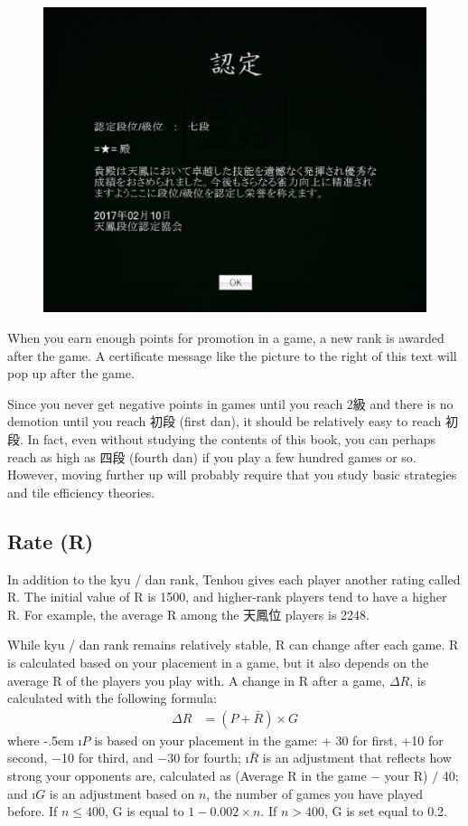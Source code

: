 \bigskip
\begin{figure}
\vspace{-30pt}
\begin{center}
\includegraphics[width=.45\textwidth,clip]{figs/7dan}
\end{center}
\vspace{-25pt}
\end{figure}
When you earn enough points for promotion in a game, a new rank is awarded after the game. A certificate message like the picture to the right of this text will pop up after the game. 

\bigskip
Since you never get negative points in games until you reach 2級 and there is no demotion until you reach 初段 (first {\jap dan}), it should be relatively easy to reach 初段. In fact, even without studying the contents of this book, you can perhaps reach as high as 四段 (fourth {\jap dan}) if you play a few hundred games or so. However, moving further up will probably require that you study basic strategies and tile efficiency theories. 

\subsection{Rate (R)}

In addition to the {\jap kyu / dan} rank, {\jap Tenhou} gives each player another rating called R. The initial value of R is 1500, and higher-rank players tend to have a higher R. For example, the average R among the 天鳳位 players is 2248.%

\bigskip
While {\jap kyu / dan} rank remains relatively stable, R can change after each game. R is calculated based on your placement in a game, but it also depends on the average R of the players you play with. 
A change in R after a game, $\Delta R$, is calculated with the following formula:
\begin{align*}
\Delta R &= (P + \bar{R}) \times G
\end{align*}
where 
\bi \itemsep-.5em
\i $P$ is based on your placement in the game: + 30 for first, +10 for second, $-$10 for third, and $-$30 for fourth;
\i $\bar{R}$ is an adjustment that reflects how strong your opponents are, calculated as (Average R in the game $-$ your R) $/$ 40; and
\i $G$ is an adjustment based on $n$, the number of games you have played before. If $n \leq 400$, G is equal to $1-0.002 \times n$. If $n > 400$, G is set equal to 0.2.
\ei


